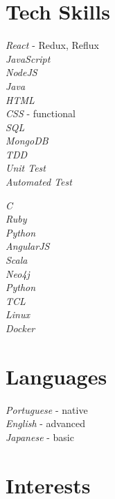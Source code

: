 \documentclass[10pt]{article} %
\begin{document}
\section{Tech Skills}

{
\textit{React} - Redux, Reflux\\
\textit{JavaScript}\\
\textit{NodeJS}\\
\textit{Java}\\
\textit{HTML}\\
\textit{CSS} - functional\\
\textit{SQL}\\
\textit{MongoDB}\\
\textit{TDD}\\
\textit{Unit Test}\\
\textit{Automated Test}\\
}


{
\textit{C}\\
\textit{Ruby}\\
\textit{Python}\\
\textit{AngularJS}\\
\textit{Scala}\\
\textit{Neo4j}\\
\textit{Python}\\
\textit{TCL}\\
\textit{Linux}\\
\textit{Docker}\\
}



\section{Languages}
{
\textit{Portuguese} - native\\
\textit{English} - advanced\\
\textit{Japanese} - basic\\
}




\section{Interests}
\end{document}
